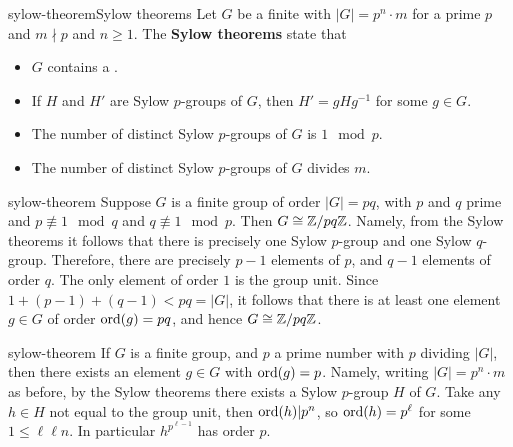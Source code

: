\begin{topic}{sylow-theorem}{Sylow theorems}
    Let $G$ be a finite  with $|G| = p^n \cdot m$ for a prime $p$ and $m \nmid p$ and $n \ge 1$. The \textbf{Sylow theorems} state that
    \begin{itemize}
        \item $G$ contains a .
        \item If $H$ and $H'$ are Sylow $p$-groups of $G$, then $H' = gHg^{-1}$ for some $g \in G$.
        \item The number of distinct Sylow $p$-groups of $G$ is $1 \mod p$.
        \item The number of distinct Sylow $p$-groups of $G$ divides $m$. 
    \end{itemize}
\end{topic}

\begin{example}{sylow-theorem}
    Suppose $G$ is a finite group of order $|G| = pq$, with $p$ and $q$ prime and $p \not\equiv 1 \mod q$ and $q \not\equiv 1 \mod p$. Then $G \cong \mathbb{Z}/pq\mathbb{Z}$. Namely, from the Sylow theorems it follows that there is precisely one Sylow $p$-group and one Sylow $q$-group. Therefore, there are precisely $p - 1$ elements of  $p$, and $q - 1$ elements of order $q$. The only element of order $1$ is the group unit. Since $1 + (p - 1) + (q - 1) < pq = |G|$, it follows that there is at least one element $g \in G$ of order $\textup{ord}(g) = pq$, and hence $G \cong \mathbb{Z}/pq\mathbb{Z}$.
\end{example}

\begin{example}{sylow-theorem}
    If $G$ is a finite group, and $p$ a prime number with $p$ dividing $|G|$, then there exists an element $g \in G$ with $\textup{ord}(g) = p$. Namely, writing $|G| = p^n \cdot m$ as before, by the Sylow theorems there exists a Sylow $p$-group $H$ of $G$. Take any $h \in H$ not equal to the group unit, then $\textup{ord}(h) | p^n$, so $\textup{ord}(h) = p^\ell$ for some $1 \le \ell \ell n$. In particular $h^{p^{\ell - 1}}$ has order $p$.
\end{example}

